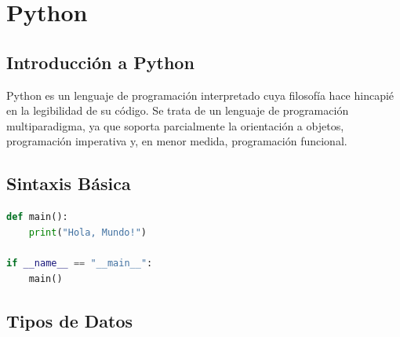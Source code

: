 \chapter{Python}
\section{Introducción a Python}
Python es un lenguaje de programación interpretado cuya filosofía hace hincapié en la legibilidad de su código. Se trata de un lenguaje de programación multiparadigma, ya que soporta parcialmente la orientación a objetos, programación imperativa y, en menor medida, programación funcional.

\section{Sintaxis Básica}
\begin{lstlisting}[language=Python, caption=Hola Mundo en Python]
def main():
    print("Hola, Mundo!")

if __name__ == "__main__":
    main()
\end{lstlisting}

\section{Tipos de Datos}
